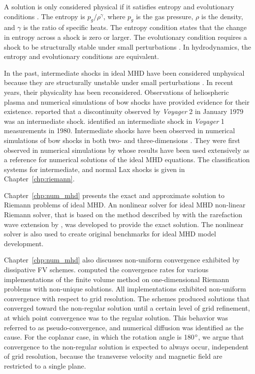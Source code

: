 A solution is only considered physical if it satisfies entropy and evolutionary conditions \citep{Jeffrey:1964}.  The entropy is $p_g/\rho^{\gamma}$, where $p_g$ is the gas pressure, $\rho$ is the density, and $\gamma$ is the ratio of specific heats.  The entropy condition states that the change in entropy across a shock is zero or larger.  The evolutionary condition requires a shock to be structurally stable under small perturbations \citep{Jeffrey:1964}.  In hydrodynamics, the entropy and evolutionary conditions are equivalent.

In the past, intermediate shocks in ideal MHD have been considered unphysical because they are structurally unstable under small perturbations \citep{Landau:1984}.  In recent years, their physicality has been reconsidered. Observations of heliospheric plasma and numerical simulations of bow shocks have provided evidence for their existence. \citet{Feng:2008} reported that a discontinuity observed by \emph{Voyager} 2 in January 1979 was an intermediate shock. \citet{Chao:1993} identified an intermediate shock in \emph{Voyager} 1 measurements in 1980. Intermediate shocks have been observed in numerical simulations of bow shocks in both two- and three-dimensions \citep{DeSterck:1998,DeSterck:2000}.  They were first observed in numerical simulations by \citet{Brio:1988} whose results have been used extensively as a reference for numerical solutions of the ideal MHD equations.  The classification systems for intermediate, and normal Lax shocks is given in Chapter~\ref{chp:riemann}.

Chapter~\ref{chp:num_mhd} presents the exact and approximate solution to Riemann problems of ideal MHD.  An nonlinear solver for ideal MHD non-linear Riemann solver, that is based on the method described by \citet{Dai:1994a} with the rarefaction wave extension by \citet{Ryu:1995a}, was developed to provide the exact solution.  The nonlinear solver is also used to create original benchmarks for ideal MHD model development.  

Chapter~\ref{chp:num_mhd} also discusses non-uniform convergence exhibited by dissipative FV schemes.  \citet{Torrilhon:2003b} computed the convergence rates for various implementations of the finite volume method on one-dimensional Riemann problems with non-unique solutions. All implementations exhibited non-uniform convergence with respect to grid resolution.  The schemes produced solutions that converged toward the non-regular solution until a certain level of grid refinement, at which point convergence was to the regular solution.  This behavior was referred to as pseudo-convergence, and numerical diffusion was identified as the cause.  For the coplanar case, in which the rotation angle is 180$^\circ$, we argue that convergence to the non-regular solution is expected to always occur, independent of grid resolution, because the transverse velocity and magnetic field are restricted to a single plane.


